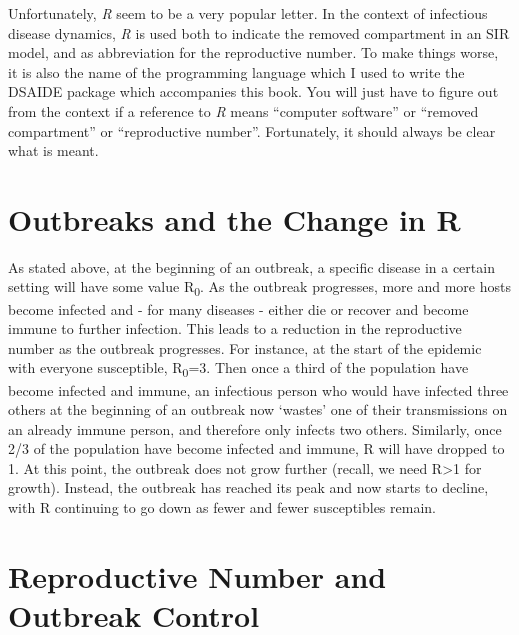 \documentclass[
]{book}
\begin{document}
Unfortunately, \emph{R} seem to be a very popular letter. In the context of infectious disease dynamics, \emph{R} is used both to indicate the removed compartment in an SIR model, and as abbreviation for the reproductive number. To make things worse, it is also the name of the programming language which I used to write the DSAIDE package which accompanies this book. You will just have to figure out from the context if a reference to \emph{R} means ``computer software'' or ``removed compartment'' or ``reproductive number''. Fortunately, it should always be clear what is meant.

\hypertarget{outbreaks-and-the-change-in-r}{%
\section{Outbreaks and the Change in R}\label{outbreaks-and-the-change-in-r}}

As stated above, at the beginning of an outbreak, a specific disease in a certain setting will have some value R\textsubscript{0}. As the outbreak progresses, more and more hosts become infected and - for many diseases - either die or recover and become immune to further infection. This leads to a reduction in the reproductive number as the outbreak progresses. For instance, at the start of the epidemic with everyone susceptible, R\textsubscript{0}=3. Then once a third of the population have become infected and immune, an infectious person who would have infected three others at the beginning of an outbreak now `wastes' one of their transmissions on an already immune person, and therefore only infects two others. Similarly, once 2/3 of the population have become infected and immune, R will have dropped to 1. At this point, the outbreak does not grow further (recall, we need R\textgreater1 for growth). Instead, the outbreak has reached its peak and now starts to decline, with R continuing to go down as fewer and fewer susceptibles remain.

\hypertarget{reproductive-number-and-outbreak-control}{%
\section{Reproductive Number and Outbreak Control}\label{reproductive-number-and-outbreak-control}}
\end{document}
